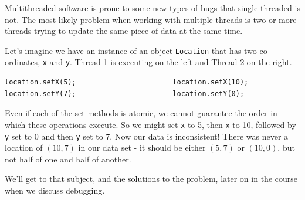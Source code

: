 Multithreaded software is prone to some new types of bugs that single threaded is not. The most likely problem when working with multiple threads is two or more threads trying to update the same piece of data at the same time.

Let's imagine we have an instance of an object \texttt{Location} that has two co-ordinates, \texttt{x} and \texttt{y}. Thread 1 is executing on the left and Thread 2 on the right.

\begin{verbatim}
location.setX(5);                       location.setX(10);
location.setY(7);                       location.setY(0);
\end{verbatim}

Even if each of the set methods is atomic, we cannot guarantee the order in which these operations execute. So we might set \texttt{x} to 5, then \texttt{x} to 10, followed by \texttt{y} set to 0 and then \texttt{y} set to 7. Now our data is inconsistent! There was never a location of $(10, 7)$ in our data set - it should be either $(5, 7)$ or $(10, 0)$, but not half of one and half of another.

We'll get to that subject, and the solutions to the problem, later on in the course when we discuss debugging. 




